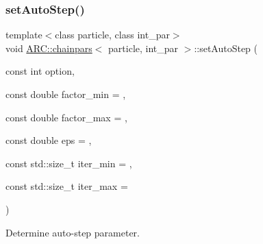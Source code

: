 \subsubsection{\texorpdfstring{set\+Auto\+Step()}{setAutoStep()}}
{\footnotesize\ttfamily template$<$class particle, class int\+\_\+par$>$ \\
void \hyperlink{classARC_1_1chainpars}{A\+R\+C\+::chainpars}$<$ particle, int\+\_\+par $>$\+::set\+Auto\+Step (\begin{DoxyParamCaption}\item[{const int}]{option,  }\item[{const double}]{factor\+\_\+min = {},  }\item[{const double}]{factor\+\_\+max = {},  }\item[{const double}]{eps = {},  }\item[{const std\+::size\+\_\+t}]{iter\+\_\+min = {},  }\item[{const std\+::size\+\_\+t}]{iter\+\_\+max = {} }\end{DoxyParamCaption})\hspace{0.3cm}{\ttfamily [inline]}}



Determine auto-\/step parameter. 


